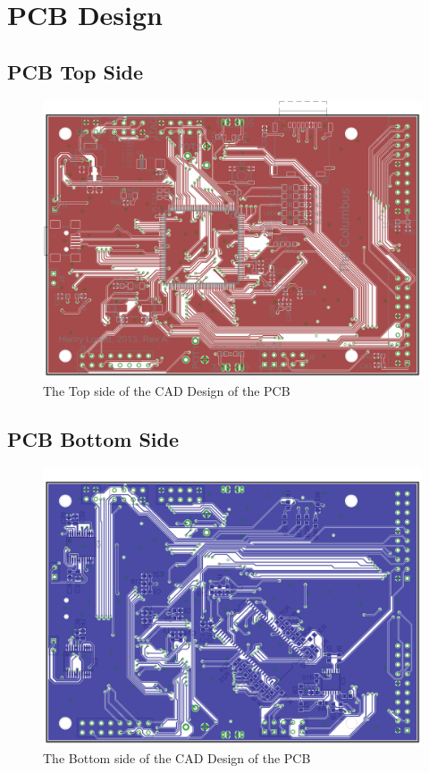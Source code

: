 \chapter{PCB Design} \label{Appendix:PCB}
\section{PCB Top Side}
\begin{figure}[ht!]
\centering
\includegraphics[angle=90,width=\textwidth,height=\textheight-5cm,keepaspectratio]{Figures/ColumbusPCBTop_GP.png} 
\caption{The Top side of the CAD Design of the PCB}
\label{fig:PCB:Eagle:Top}
\end{figure}
\section{PCB Bottom Side}
\begin{figure}[ht!]
\centering
\includegraphics[angle=90,width=\textwidth,height=\textheight-5cm,keepaspectratio]{Figures/ColumbusPCBBottom_GP.png} 
\caption{The Bottom side of the CAD Design of the PCB}
\label{fig:PCB:Eagle:Bottom}
\end{figure}